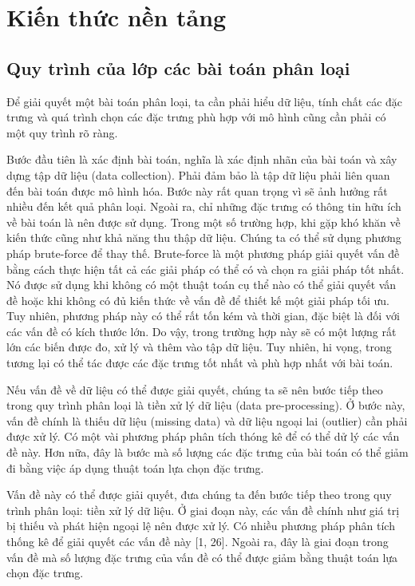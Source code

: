 \chapter{Kiến thức nền tảng}

\section{Quy trình của lớp các bài toán phân loại}
Để giải quyết một bài toán phân loại, ta cần phải hiểu dữ liệu, tính chất các đặc trưng và quá trình chọn các đặc trưng phù hợp với mô hình cũng cần phải có một quy trình rõ ràng.

Bước đầu tiên là xác định bài toán, nghĩa là xác định nhãn của bài toán và xây dựng tập dữ liệu (data collection). Phải đảm bảo là tập dữ liệu phải liên quan đến bài toán được mô hình hóa. Bước này rất quan trọng vì sẽ ảnh hưởng rất nhiều đến kết quả phân loại. Ngoài ra, chỉ những đặc trưng có thông tin hữu ích về bài toán là nên được sử dụng. Trong một số trường hợp, khi gặp khó khăn về kiến thức cũng như khả năng thu thập dữ liệu. Chúng ta có thể sử dụng phương pháp brute-force để thay thế. Brute-force là một phương pháp giải quyết vấn đề bằng cách thực hiện tất cả các giải pháp có thể có và chọn ra giải pháp tốt nhất. Nó được sử dụng khi không có một thuật toán cụ thể nào có thể giải quyết vấn đề hoặc khi không có đủ kiến thức về vấn đề để thiết kế một giải pháp tối ưu. Tuy nhiên, phương pháp này có thể rất tốn kém và thời gian, đặc biệt là đối với các vấn đề có kích thước lớn. Do vậy, trong trường hợp này sẽ có một lượng rất lớn các biến được đo, xử lý và thêm vào tập dữ liệu. Tuy nhiên, hi vọng, trong tương lại có thể tác được các đặc trưng tốt nhất và phù hợp nhất với bài toán.

Nếu vấn đề về dữ liệu có thể được giải quyết, chúng ta sẽ nên bước tiếp theo trong quy trình phân loại là tiền xử lý dữ liệu (data pre-processing). Ở bước này, vấn đề chính là thiếu dữ liệu (missing data) và dữ liệu ngoại lai (outlier) cần phải được xử lý. Có một vài phương pháp phân tích thóng kê \cite{aggarwal2001outlier, hodge2004survey} để có thể dử lý các vấn đề này. Hơn nữa, đây là bước mà số lượng các đặc trưng của bài toán có thể giảm đi bằng việc áp dụng thuật toán lựa chọn đặc trưng.

Vấn đề này có thể được giải quyết, đưa chúng ta đến bước tiếp theo trong quy trình phân loại: tiền xử lý dữ liệu. Ở giai đoạn này, các vấn đề chính như giá trị bị thiếu và phát hiện ngoại lệ nên được xử lý. Có nhiều phương pháp phân tích thống kê để giải quyết các vấn đề này [1, 26]. Ngoài ra, đây là giai đoạn trong vấn đề mà số lượng đặc trưng của vấn đề có thể được giảm bằng thuật toán lựa chọn đặc trưng.

